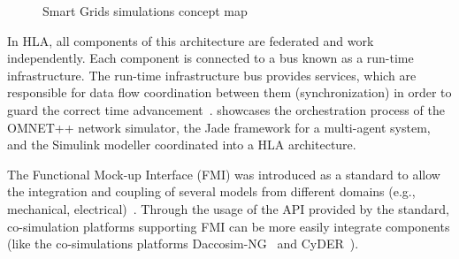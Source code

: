 \documentclass[1p]{elsarticle} %
\begin{document}
\begin{figure}[!htb]
{{}\par}
\caption{Smart Grids simulations concept map} \label{fig:Mindmap}
\end{figure}


In HLA, all components of this architecture are federated and work independently. Each component is connected to a bus known as a run-time infrastructure. The run-time infrastructure bus provides services, which are responsible for data flow coordination between them (synchronization) in order to guard the correct time advancement~\citep{HLAarch,IEEEHLA3}. \citet{HLAarch} showcases the orchestration process of the OMNET++ network simulator, the Jade framework for a multi-agent system, and the Simulink modeller coordinated into a HLA architecture.

The Functional Mock-up Interface (FMI) was introduced as a standard to allow the integration and coupling of several models from different domains (e.g., mechanical, electrical)~\citep{ref:blochwitz2011functional}. Through the usage of the API provided by the standard, co-simulation platforms supporting FMI can be more easily integrate components (like the co-simulations platforms Daccosim-NG~\citep{ref:evora2019daccosim} and CyDER~\citep{ref:nouidui2019cyder}).




\end{document}
